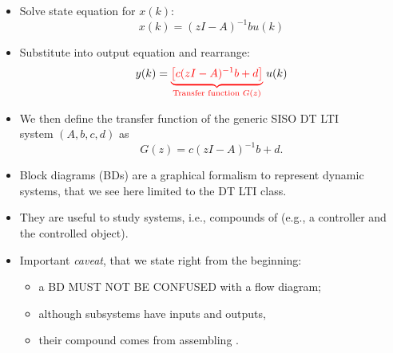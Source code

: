 \begin{frame}
\myPause
 \begin{itemize}[<+-| alert@+>]
 \item Solve state equation for $x(k)$:
       \begin{displaymath}
        x(k) = (zI-A)^{-1} b u(k)
       \end{displaymath} 
 \item Substitute into output equation and rearrange:
       \begin{displaymath}
        y(k) = \textcolor{red}
                         {\underbrace{\left[c(zI-A)^{-1} b +d \right]}
                                    _{\text{Transfer function } G(z)}
                         } \; u(k)
       \end{displaymath} 
 \item We then define the transfer function of the generic SISO DT LTI\\
       system $(A,b,c,d)$ as
       \begin{displaymath}
        G(z) = c(zI-A)^{-1} b +d.
       \end{displaymath} 
 \end{itemize}
\end{frame}

\begin{frame}
\myPause
\begin{itemize}[<+-| alert@+>]
\item Block diagrams (BDs) are a graphical formalism to represent dynamic systems, that we see here limited to the
      DT LTI class.
\item They are useful to study  systems, i.e., compounds of  (e.g., a controller
      and the controlled object).
\item Important \emph{caveat}, that we state right from the beginning:
      \begin{itemize}[<+-| alert@+>]
      \item    a BD MUST NOT BE CONFUSED with a flow diagram;
      \item [] although subsystems have inputs and outputs,
      \item [] their compound comes from assembling .
      \end{itemize}
\end{itemize}
\end{frame}

